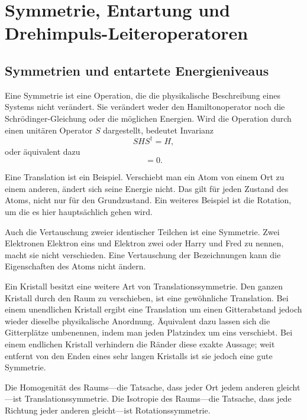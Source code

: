 \chapter{Symmetrie, Entartung und Drehimpuls-Leiteroperatoren}
\providecommand{\ket}[1]{\left\lvert#1\right\rangle}

\section{Symmetrien und entartete Energieniveaus}

Eine Symmetrie ist eine Operation, die die physikalische Beschreibung eines Systems nicht verändert. Sie verändert weder den Hamiltonoperator noch die Schr\"odinger-Gleichung oder die möglichen Energien. Wird die Operation durch einen unitären Operator \(S\) dargestellt, bedeutet Invarianz
\begin{equation}
S H S^\dagger=H,
\end{equation}
oder äquivalent dazu
\begin{equation}
[S,H]=0.
\end{equation}

Eine Translation ist ein Beispiel. Verschiebt man ein Atom von einem Ort zu einem anderen, ändert sich seine Energie nicht. Das gilt für jeden Zustand des Atoms, nicht nur für den Grundzustand. Ein weiteres Beispiel ist die Rotation, um die es hier hauptsächlich gehen wird.

Auch die Vertauschung zweier identischer Teilchen ist eine Symmetrie. Zwei Elektronen Elektron eins und Elektron zwei oder Harry und Fred zu nennen, macht sie nicht verschieden. Eine Vertauschung der Bezeichnungen kann die Eigenschaften des Atoms nicht ändern.

Ein Kristall besitzt eine weitere Art von Translationssymmetrie. Den ganzen Kristall durch den Raum zu verschieben, ist eine gewöhnliche Translation. Bei einem unendlichen Kristall ergibt eine Translation um einen Gitterabstand jedoch wieder dieselbe physikalische Anordnung. Äquivalent dazu lassen sich die Gitterplätze umbenennen, indem man jeden Platzindex um eins verschiebt. Bei einem endlichen Kristall verhindern die Ränder diese exakte Aussage; weit entfernt von den Enden eines sehr langen Kristalls ist sie jedoch eine gute Symmetrie.

Die Homogenität des Raums---die Tatsache, dass jeder Ort jedem anderen gleicht---ist Translationssymmetrie. Die Isotropie des Raums---die Tatsache, dass jede Richtung jeder anderen gleicht---ist Rotationssymmetrie.

